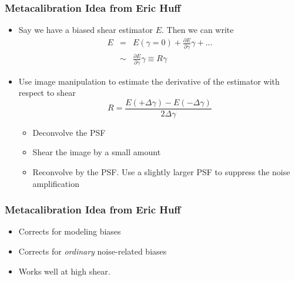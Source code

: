 \documentclass{beamer}
\begin{document}
\frame
{
    \frametitle{Metacalibration Idea from Eric Huff}

 
    \begin{itemize}

        \item Say we have a biased shear estimator {\color{gold} $E$}.  Then we can write
            {\color{gold}
                \begin{eqnarray}
                    E & = & E(\gamma=0) + \frac{\partial E}{\partial \gamma} \gamma + ... \nonumber \\
                      & \sim &  \frac{\partial E}{\partial \gamma} \gamma \equiv R \gamma \nonumber 
                \end{eqnarray}
            } 
        \item Use image manipulation to estimate the derivative of the
            estimator with respect to shear
            {\color{gold}
                \begin{equation}
                    R = \frac{E(+\Delta\gamma) - E(-\Delta\gamma)}{2 \Delta \gamma} \nonumber 
                \end{equation}
            }
            \begin{itemize}
                \item Deconvolve the PSF
                \item Shear the image by a small amount
                \item Reconvolve by the PSF.  Use a slightly larger PSF to suppress
                    the noise amplification
            \end{itemize}


    \end{itemize}

}

\frame
{
    \frametitle{Metacalibration Idea from Eric Huff}

 
    \begin{itemize}
        
        \item Corrects for modeling biases

        \item Corrects for {\em ordinary} noise-related biases

        \item Works well at high shear.

    \end{itemize}

}
\end{document}
